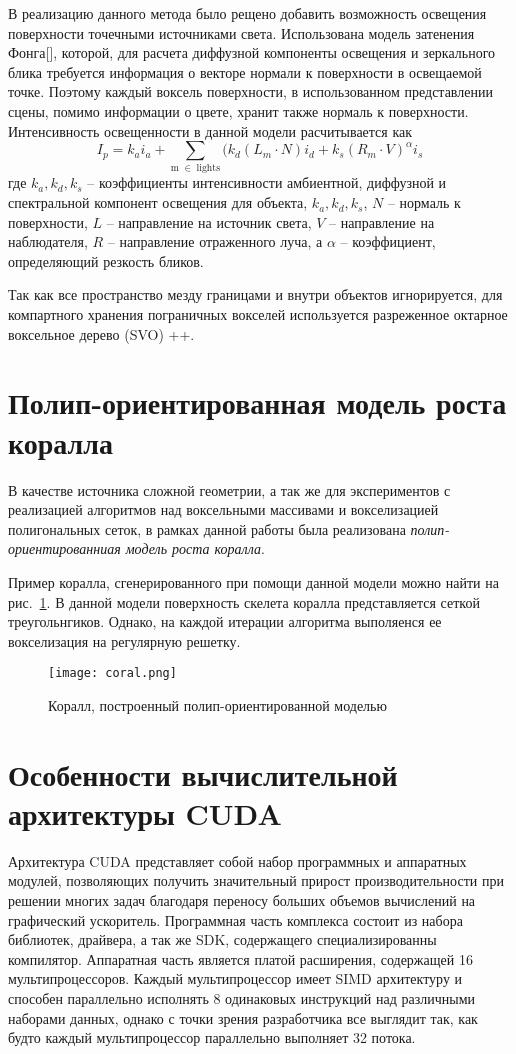В реализацию данного метода было рещено добавить возможность освещения поверхности точечными источниками света. Использована модель затенения Фонга[], которой, для расчета диффузной компоненты освещения и зеркального блика требуется информация о векторе нормали к поверхности в освещаемой точке. Поэтому каждый воксель поверхности, в использованном представлении сцены, помимо информации о цвете, хранит также нормаль к поверхности. Интенсивность освещенности в данной модели расчитывается как $$ I_p = k_a i_a + \sum_\mathrm{m \; \in \; lights} (k_d (L_m \cdot N) i_d + k_s (R_m \cdot V)^{\alpha}i_s $$
где  $k_a, k_d, k_s$ -- коэффициенты интенсивности амбиентной, диффузной и спектральной компонент освещения для объекта, $k_a, k_d, k_s$, $N$ -- нормаль к поверхности, $L$ -- направление на источник света, $V$ -- направление на наблюдателя, $R$ -- направление отраженного луча, а $\alpha$ -- коэффициент, определяющий резкость бликов.

Так как все пространство мезду границами и внутри объектов игнорируется, для компартного хранения пограничных вокселей используется разреженное октарное воксельное дерево (SVO) ++.

\section{Полип-ориентированная модель роста коралла}
В качестве источника сложной геометрии, а так же для экспериментов с реализацией алгоритмов над воксельными массивами и вокселизацией полигональных сеток, в рамках данной работы была реализована \emph{полип-ориентированниая модель роста коралла}\cite{merks_coral}. 

Пример коралла, сгенерированного при помощи данной модели можно найти на рис.~\ref{fig:coral}. В данной модели поверхность скелета коралла представляется сеткой треугольнгиков. Однако, на каждой итерации алгоритма выполяенся ее вокселизация на регулярную решетку.

\begin{figure}[ht]
\center
\texttt{[image: coral.png]}
\caption{Коралл, построенный полип-ориентированной моделью}
\label{fig:coral}
\end{figure}

\section{Особенности вычислительной архитектуры CUDA}

Архитектура CUDA представляет собой набор программных и аппаратных модулей, позволяющих получить значительный прирост производительности при решении многих задач благодаря переносу больших объемов вычислений на графический ускоритель. Программная часть комплекса состоит из набора библиотек, драйвера, а так же SDK, содержащего специализированны компилятор. Аппаратная часть является платой расширения, содержащей 16 мультипроцессоров. Каждый мультипроцессор имеет SIMD архитектуру и способен параллельно исполнять 8 одинаковых инструкций над различными наборами данных, однако с точки зрения разработчика все выглядит так, как будто каждый мультипроцессор параллельно выполняет 32 потока. 

